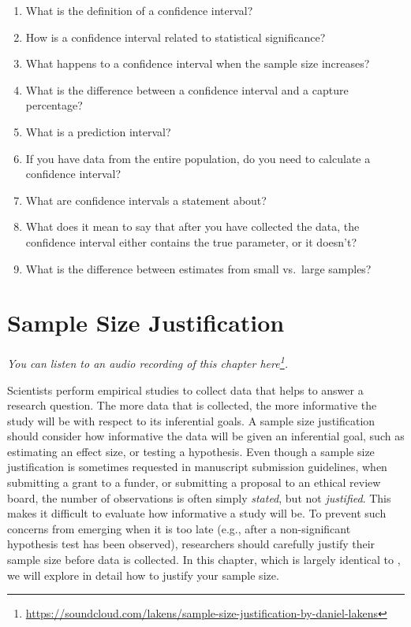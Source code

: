 \documentclass[
  oneside]{krantz}
\renewcommand{\href}[2]{#2\footnote{\url{#1}}}
\begin{document}
\begin{enumerate}
\def\labelenumi{\arabic{enumi}.}
\item
  What is the definition of a confidence interval?
\item
  How is a confidence interval related to statistical significance?
\item
  What happens to a confidence interval when the sample size increases?
\item
  What is the difference between a confidence interval and a capture percentage?
\item
  What is a prediction interval?
\item
  If you have data from the entire population, do you need to calculate a confidence interval?
\item
  What are confidence intervals a statement about?
\item
  What does it mean to say that after you have collected the data, the confidence interval either contains the true parameter, or it doesn't?
\item
  What is the difference between estimates from small vs.~large samples?
\end{enumerate}

\hypertarget{power}{%
\chapter{Sample Size Justification}\label{power}}

\emph{You can listen to an audio recording of this chapter \href{https://soundcloud.com/lakens/sample-size-justification-by-daniel-lakens}{here}.}

Scientists perform empirical studies to collect data that helps to answer a research question. The more data that is collected, the more informative the study will be with respect to its inferential goals. A sample size justification should consider how informative the data will be given an inferential goal, such as estimating an effect size, or testing a hypothesis. Even though a sample size justification is sometimes requested in manuscript submission guidelines, when submitting a grant to a funder, or submitting a proposal to an ethical review board, the number of observations is often simply \emph{stated}, but not \emph{justified}. This makes it difficult to evaluate how informative a study will be. To prevent such concerns from emerging when it is too late (e.g., after a non-significant hypothesis test has been observed), researchers should carefully justify their sample size before data is collected. In this chapter, which is largely identical to \citet{lakens_sample_2022}, we will explore in detail how to justify your sample size.
\end{document}
